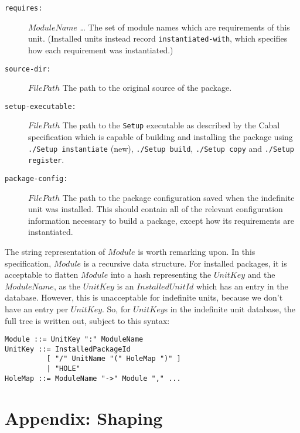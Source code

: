 \documentclass{article}
\newcommand{\I}[1]{\ensuremath{\mathit{#1}}}
\begin{document}
\begin{description}
    \item[\texttt{requires:}] \I{ModuleName} \ldots \newline
        The set of module names which are requirements of this unit.
        (Installed units instead record \texttt{instantiated-with}, which
        specifies how each requirement was instantiated.)
    \item[\texttt{source-dir:}] \I{FilePath} \newline
        The path to the original source of the package.
    \item[\texttt{setup-executable:}] \I{FilePath} \newline
        The path to the \texttt{Setup} executable as described by the Cabal
        specification which is capable of building and installing the package
        using \texttt{./Setup instantiate} (new),
        \texttt{./Setup build}, \texttt{./Setup copy} and
        \texttt{./Setup register}.
    \item[\texttt{package-config:}] \I{FilePath} \newline
        The path to the package configuration saved when the indefinite
        unit was installed.  This should contain all of the relevant configuration
        information necessary to build a package, except how its requirements
        are instantiated.
\end{description}
%
The string representation of \I{Module} is worth remarking upon.  In
this specification, \I{Module} is a recursive data structure.  For
installed packages, it is acceptable to flatten \I{Module} into a
hash representing the \I{UnitKey} and the \I{ModuleName}, as the \I{UnitKey}
is an \I{InstalledUnitId} which has an entry in the database.  However,
this is unacceptable for indefinite units, because we don't have an
entry per \I{UnitKey}.  So, for \I{UnitKey}s in the indefinite unit database,
the full tree is written out, subject to this syntax:

\begin{verbatim}
Module ::= UnitKey ":" ModuleName
UnitKey ::= InstalledPackageId
          [ "/" UnitName "(" HoleMap ")" ]
          | "HOLE"
HoleMap ::= ModuleName "->" Module "," ...
\end{verbatim}

\section{Appendix: Shaping}
\end{document}
